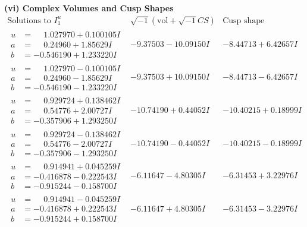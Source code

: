 \documentclass[1p]{elsarticle_modified}
\theoremstyle{definition}
\newcommand{\I}{\sqrt{-1}}
\begin{document}
\newpage\flushleft \textbf{(vi) Complex Volumes and Cusp Shapes}
$$\begin{array}{c|c|c}  
\text{Solutions to }I^u_{1}& \I (\text{vol} + \sqrt{-1}CS) & \text{Cusp shape}\\
 \hline 
\begin{aligned}
u &= \phantom{-}1.027970 + 0.100105 I \\
a &= \phantom{-}0.24960 + 1.85629 I \\
b &= -0.546190 + 1.233220 I\end{aligned}
 & -9.37503 - 10.09150 I & -8.44713 + 6.42657 I \\ \hline\begin{aligned}
u &= \phantom{-}1.027970 - 0.100105 I \\
a &= \phantom{-}0.24960 - 1.85629 I \\
b &= -0.546190 - 1.233220 I\end{aligned}
 & -9.37503 + 10.09150 I & -8.44713 - 6.42657 I \\ \hline\begin{aligned}
u &= \phantom{-}0.929724 + 0.138462 I \\
a &= \phantom{-}0.54776 + 2.00727 I \\
b &= -0.357906 + 1.293250 I\end{aligned}
 & -10.74190 + 0.44052 I & -10.40215 + 0.18999 I \\ \hline\begin{aligned}
u &= \phantom{-}0.929724 - 0.138462 I \\
a &= \phantom{-}0.54776 - 2.00727 I \\
b &= -0.357906 - 1.293250 I\end{aligned}
 & -10.74190 - 0.44052 I & -10.40215 - 0.18999 I \\ \hline\begin{aligned}
u &= \phantom{-}0.914941 + 0.045259 I \\
a &= -0.416878 - 0.222543 I \\
b &= -0.915244 - 0.158700 I\end{aligned}
 & -6.11647 - 4.80305 I & -6.31453 + 3.22976 I \\ \hline\begin{aligned}
u &= \phantom{-}0.914941 - 0.045259 I \\
a &= -0.416878 + 0.222543 I \\
b &= -0.915244 + 0.158700 I\end{aligned}
 & -6.11647 + 4.80305 I & -6.31453 - 3.22976 I \\ \hline\begin{aligned}

\end{aligned}
\end{array}$$
\end{document}
